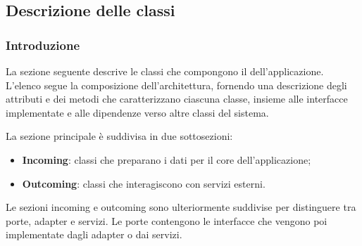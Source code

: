\subsection{Descrizione delle classi}

\subsubsection{Introduzione}
\par La sezione seguente descrive le classi che compongono il  dell'applicazione. L'elenco segue la composizione dell'architettura, fornendo una descrizione degli attributi e dei metodi che caratterizzano ciascuna classe, insieme alle interfacce implementate e alle dipendenze verso altre classi del sistema.
\par La sezione principale è suddivisa in due sottosezioni:
\begin{itemize}
  \item \textbf{Incoming}: classi che preparano i dati per il core dell'applicazione;
  \item \textbf{Outcoming}: classi che interagiscono con servizi esterni. 
\end{itemize}

\vspace{0.5\baselineskip}
\par Le sezioni incoming e outcoming sono ulteriormente suddivise per distinguere tra porte, adapter e servizi. Le porte contengono le interfacce che vengono poi implementate dagli adapter o dai servizi.


